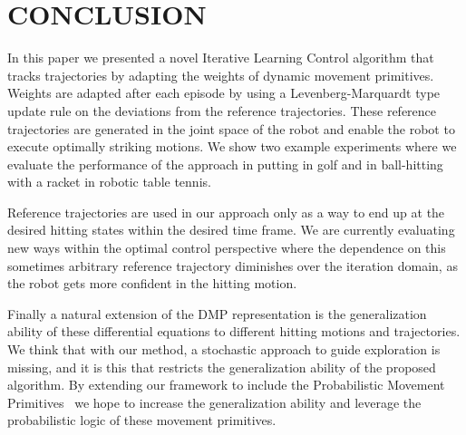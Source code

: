 \section{CONCLUSION}\label{conclusion}

In this paper we presented a novel Iterative Learning Control algorithm that tracks trajectories by adapting the weights of dynamic movement primitives. Weights are adapted after each episode by using a Levenberg-Marquardt type update rule on the deviations from the reference trajectories. These reference trajectories are generated in the joint space of the robot and enable the robot to execute optimally striking motions. We show two example experiments where we evaluate the performance of the approach in putting in golf and in ball-hitting with a racket in robotic table tennis. 

Reference trajectories are used in our approach only as a way to end up at the desired hitting states within the desired time frame. We are currently evaluating new ways within the optimal control perspective where the dependence on this sometimes arbitrary reference trajectory diminishes over the iteration domain, as the robot gets more confident in the hitting motion.

Finally a natural extension of the DMP representation is the generalization ability of these differential equations to different hitting motions and trajectories. We think that with our method, a stochastic approach to guide exploration is missing, and it is this that restricts the generalization ability of the proposed algorithm. By extending our framework to include the Probabilistic Movement Primitives~\cite{Paraschos13} we hope to increase the generalization ability and leverage the probabilistic logic of these movement primitives.

%
%
%
